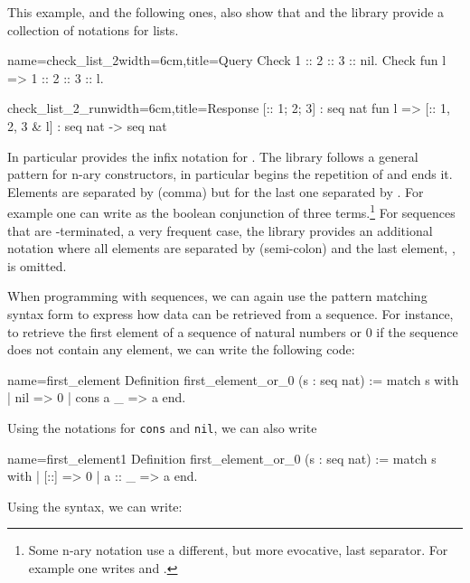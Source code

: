 This example, and the following ones, also show
that \Coq{} and the \mcbMC{} library provide
a collection of notations for lists.

\begin{coq}{name=check_list_2}{width=6cm,title=Query}
Check 1 :: 2 :: 3 :: nil.
Check fun l => 1 :: 2 :: 3 :: l.
$~$
\end{coq}
\begin{coqout}{check_list_2_run}{width=6cm,title=Response}
[:: 1; 2; 3] : seq nat
fun l => [:: 1, 2, 3 & l]
  : seq nat -> seq nat
\end{coqout}
\index[coq]{\C{[:: .. , .. & ..]}}

In particular \Coq{} provides the infix notation \C{::} for
.  The \mcbMC{} library follows a general pattern for
n-ary constructors, in particular \C{[::} begins the repetition
of \C{::} and \C{]} ends it.  Elements are separated by \C{,} (comma)
but for the last one separated by \C{&}.
For example one
can write as  the boolean conjunction
of three terms.\footnote{Some n-ary notation use a
different, but more evocative, last separator.  For example one writes
\C{[|| b1, b2 | b3]} and \C{[==> b1, b2 => b3]}.}
\index[coq]{\C{["|"| .. , .. "| ..]}}
\index[coq]{\C{[&& .. , .. & ..]}}
\index[coq]{\C{[==> .. , .. => ..]}}
For sequences that are -terminated, a very frequent case,
the \mcbMC{} library provides an additional notation where all elements are
separated by \C{;} (semi-colon) and the last element, ,
is omitted.
\index[coq]{\C{[seq .. ; ..]}}

When programming with sequences, we can again use the  pattern matching
syntax form to express how data can be retrieved from a sequence.  For
instance, to retrieve the first element of a sequence of natural numbers
or 0 if the sequence does not contain any element, we can write the
following code:

\begin{coq}{name=first_element}{}
Definition first_element_or_0 (s : seq nat) :=
  match s with
  | nil => 0
  | cons a _ => a
  end.
\end{coq}
Using the notations for {\tt cons} and {\tt nil}, we can also write

\begin{coq}{name=first_element1}{}
Definition first_element_or_0 (s : seq nat) :=
  match s with
  | [::] => 0
  | a :: _ => a
  end.
\end{coq}
Using the  syntax, we can write:

